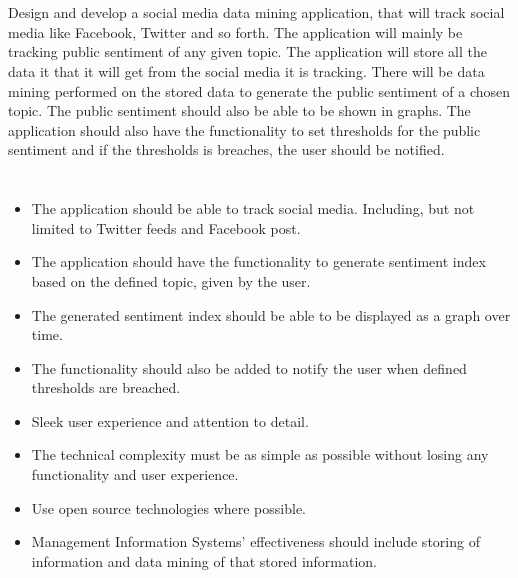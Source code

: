 \documentclass[letterpaper]{article}
\begin{document}
		\section*{\colorbox{blue}{}} 
		
		\vspace{0.2in}
		
		Design and develop a social media data mining application, that will track social media like 				Facebook, Twitter and so forth. The application will mainly be tracking public sentiment of any 			given topic. The application will store all the data it that it will get from the social media it 			is tracking. There will be data mining performed on the stored data to generate the public 					sentiment of a chosen topic. The public sentiment should also be able to be shown in graphs. The 			application should also have the functionality to set thresholds for the public sentiment and if 			the thresholds is breaches, the user should be notified.
		
		\vspace{0.2in}
		
		\section*{\colorbox{blue}{}} 
		
		\vspace{0.2in}
		
		\begin{itemize}
		\item
		The application should be able to track social media. Including, but not limited to Twitter feeds 			and Facebook post.
		\item
		The application should have the functionality to generate sentiment index based on the defined 				topic, given by the user.
		\item
		The generated sentiment index should be able to be displayed as a graph over time.
		\item
		The functionality should also be added to notify the user when defined thresholds are breached.
		\item
		Sleek user experience and attention to detail.
		\item
		The technical complexity must be as simple as possible without losing any functionality and user 			experience.
		\item
		Use open source technologies where possible.
		\item
		Management Information Systems' effectiveness should include storing of information and data 				mining of that stored information. 
		\end{itemize}
		
\end{document}
